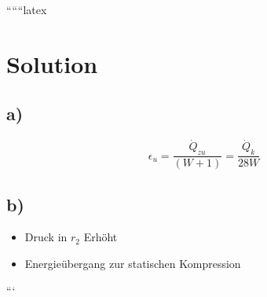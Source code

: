 ``````latex


\section*{Solution}

\subsection*{a)}
\begin{equation*}
    \epsilon_u = \frac{\dot{Q}_{zu}}{(W+1)} = \frac{\dot{Q}_k}{28W}
\end{equation*}

\subsection*{b)}
\begin{itemize}
    \item Druck in $r_2$ Erhöht
    \item Energieübergang zur statischen Kompression
\end{itemize}

```